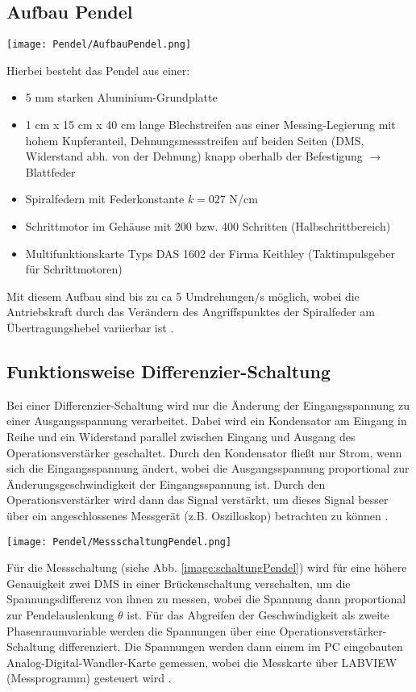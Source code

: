 \subsection{Aufbau Pendel}
\label{sub:aufbauPendel}
\begin{center}
    \texttt{[image: Pendel/AufbauPendel.png]}
    \label{image:aufbauPendel}
\end{center}
Hierbei besteht das Pendel aus einer:
\begin{itemize}
    \item 5 mm starken Aluminium-Grundplatte
    \item 1 cm x 15 cm x 40 cm lange Blechstreifen aus einer Messing-Legierung mit hohem Kupferanteil, Dehnungsmessstreifen auf beiden Seiten (DMS, Widerstand abh. von der Dehnung) knapp oberhalb der Befestigung $\rightarrow$ Blattfeder
    \item Spiralfedern mit Federkonstante $k=027$ N/cm 
    \item Schrittmotor im Gehäuse mit 200 bzw. 400 Schritten (Halbschrittbereich)
    \item Multifunktionskarte Typs DAS 1602 der Firma Keithley (Taktimpulsgeber für Schrittmotoren)
\end{itemize}
Mit diesem Aufbau sind bis zu ca 5 Umdrehungen/s möglich, wobei die Antriebskraft durch das Verändern des Angriffspunktes der Spiralfeder am Übertragungshebel variierbar ist \citep{Lueck}.

\subsection*{Funktionsweise Differenzier-Schaltung}
Bei einer Differenzier-Schaltung wird nur die Änderung der Eingangsspannung zu einer Ausgangsspannung verarbeitet. Dabei wird ein Kondensator am Eingang in Reihe und ein Widerstand parallel zwischen Eingang und Ausgang des Operationsverstärker geschaltet. Durch den Kondensator fließt nur Strom, wenn sich die Eingangsspannung ändert, wobei die Ausgangsspannung proportional zur Änderungsgeschwindigkeit der Eingangsspannung ist. Durch den Operationsverstärker wird dann das Signal verstärkt, um dieses Signal besser über ein angeschlossenes Messgerät (z.B. Oszilloskop) betrachten zu können \citep{electronik}.

\begin{center}
    \texttt{[image: Pendel/MessschaltungPendel.png]}
    \label{image:schaltungPendel}
\end{center}
Für die Messschaltung (siehe Abb. \ref{image:schaltungPendel}) wird für eine höhere Genauigkeit zwei DMS in einer Brückenschaltung verschalten, um die Spannungsdifferenz von ihnen zu messen, wobei die Spannung dann proportional zur Pendelauslenkung $\theta$ ist. Für das Abgreifen der Geschwindigkeit als zweite Phasenraumvariable werden die Spannungen über eine Operationsverstärker-Schaltung differenziert. Die Spannungen werden dann einem im PC eingebauten Analog-Digital-Wandler-Karte gemessen, wobei die Messkarte über LABVIEW (Messprogramm) gesteuert wird \citep{Lueck}.